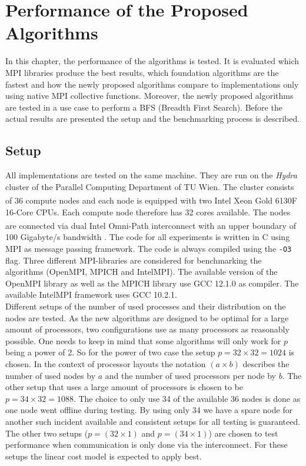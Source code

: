 
\chapter{Performance of the Proposed Algorithms} \label{chap:performance}
In this chapter, the performance of the algorithms is tested. It is evaluated which MPI libraries produce the best results, which foundation algorithms are the fastest and how the newly proposed algorithms compare to implementations only using native MPI collective functions. Moreover, the newly proposed algorithms are tested in a use case to perform a BFS (Breadth First Search). Before the actual results are presented the setup and the benchmarking process is described.

\section{Setup} \label{sec:setupCluster}
All implementations are tested on the same machine. They are run on the \emph{Hydra} cluster of the Parallel Computing Department of TU Wien. The cluster consists of 36 compute nodes and each node is equipped with two Intel\textsuperscript{\textregistered} Xeon\textsuperscript{\textregistered} Gold 6130F 16-Core CPUs. Each compute node therefore has 32 cores available. The nodes are connected via dual Intel\textsuperscript{\textregistered} Omni-Path interconnect with an upper boundary of 100 Gigabyte/s bandwidth \cite{traeff2025}. The code for all experiments is written in C using MPI as message passing framework. The code is always compiled using the \texttt{-O3} flag. Three different MPI-libraries are considered for benchmarking the algorithms (OpenMPI, MPICH and IntelMPI). The available version of the OpenMPI library as well as the MPICH library use GCC 12.1.0 as compiler. The available IntelMPI framework uses GCC 10.2.1.\\
Different setups of the number of used processes and their distribution on the nodes are tested. As the new algorithms are designed to be optimal for a large amount of processors, two configurations use as many processors as reasonably possible. One needs to keep in mind that some algorithms will only work for $p$ being a power of 2. So for the power of two case the setup $p=32\times 32 = 1024$ is chosen. In the context of processor layouts the notation $(a\times b)$ describes the number of used nodes by $a$ and  the number of used processors per node by $b$. The other setup that uses a large amount of processors is chosen to be $p=34\times32=1088$. The choice to only use 34 of the available 36 nodes is done as one node went offline during testing. By using only 34 we have a spare node for another such incident available and consistent setups for all testing is guaranteed. The other two setups ($p=(32\times 1)$ and $p=(34\times 1)$) are chosen to test performance when communication is only done via the interconnect. For these setups the linear cost model is expected to apply best.

